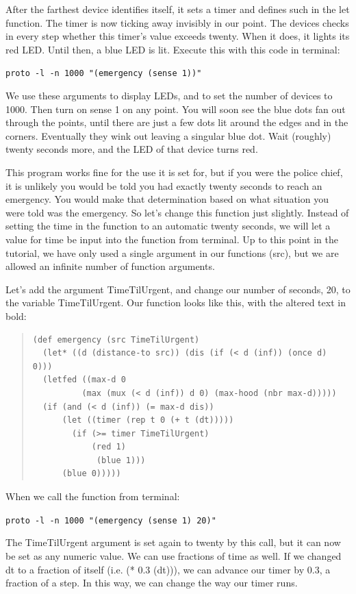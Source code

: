 \documentclass{article}
\newcommand\code[1]{\begin{center}\var{#1}\end{center}}
\newcommand\var[1]{{\tt #1}}
\begin{document}
After the farthest device identifies itself, it sets a timer and
defines such in the let function. The timer is now ticking away
invisibly in our point. The devices checks in every step whether this
timer's value exceeds twenty. When it does, it lights its red
LED. Until then, a blue LED is lit. Execute this with this code in
terminal:

\code{proto -l -n 1000 "(emergency (sense 1))"}

We use these arguments to display LEDs, and to set the number of
devices to 1000.  Then turn on sense 1 on any point. You will soon see
the blue dots fan out through the points, until there are just a few
dots lit around the edges and in the corners. Eventually they wink out
leaving a singular blue dot. Wait (roughly) twenty seconds more, and
the LED of that device turns red.

This program works fine for the use it is set for, but if you were the
police chief, it is unlikely you would be told you had exactly twenty
seconds to reach an emergency. You would make that determination based
on what situation you were told was the emergency. So let's change
this function just slightly. Instead of setting the time in the
function to an automatic twenty seconds, we will let a value for time
be input into the function from terminal. Up to this point in the
tutorial, we have only used a single argument in our functions (src),
but we are allowed an infinite number of function arguments.

Let's add the argument TimeTilUrgent, and change our number of
seconds, 20, to the variable TimeTilUrgent. Our function looks like
this, with the altered text in bold:

\begin{quote}
\begin{verbatim}
(def emergency (src TimeTilUrgent) 
  (let* ((d (distance-to src)) (dis (if (< d (inf)) (once d) 0))) 
  (letfed ((max-d 0 
	      (max (mux (< d (inf)) d 0) (max-hood (nbr max-d))))) 
  (if (and (< d (inf)) (= max-d dis)) 
      (let ((timer (rep t 0 (+ t (dt))))) 			 
		(if (>= timer TimeTilUrgent) 
		    (red 1) 
	         (blue 1))) 
      (blue 0)))))
\end{verbatim}
\end{quote}

When we call the function from terminal:

\code{proto -l -n 1000 "(emergency (sense 1) 20)"}

The TimeTilUrgent argument is set again to twenty by this call, but it
can now be set as any numeric value. We can use fractions of time as
well. If we changed dt to a fraction of itself (i.e. (* 0.3 (dt))), we
can advance our timer by 0.3, a fraction of a step. In this way, we
can change the way our timer runs.
\end{document}
